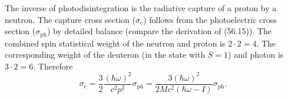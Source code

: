 The inverse of photodisintegration is the radiative capture of a proton by a neutron. The capture cross section ($\sigma_{\mathrm c}$) follows from the photoelectric cross section ($\sigma_{\mathrm{ph}}$) by detailed balance (compare the derivation of (56.15)). The combined spin statistical weight of the neutron and proton is $2\cdot2=4$. The corresponding weight of the deuteron (in the state with $S=1$) and photon is $3\cdot2=6$. Therefore
\begin{equation}
\sigma_{\mathrm c}=\frac32\frac{(\hbar\omega)^2}{c^2p^2}\sigma_{\mathrm{ph}}
=\frac{3(\hbar\omega)^2}{2Mc^2(\hbar\omega-I)}\sigma_{\mathrm{ph}}.
\tag{58.8}
\end{equation}

